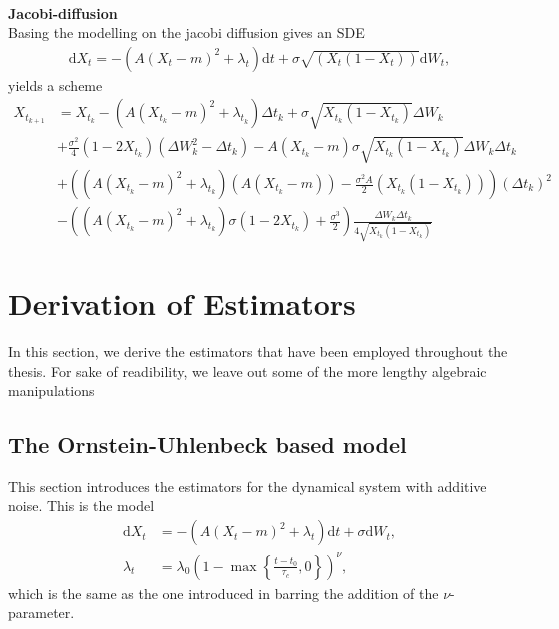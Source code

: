 \\
\textbf{Jacobi-diffusion}\\
Basing the modelling on the jacobi diffusion gives an SDE
\begin{align}
    \mathrm{d}X_t = -\left(A(X_t - m)^2 + \lambda_t\right)\mathrm{d}t + \sigma \sqrt{\left(X_t\left(1 - X_t\right)\right)}\mathrm{d}W_t,
\end{align}
yields a scheme
\begin{align}
    X_{t_{k + 1}} &= X_{t_k} - \left(A(X_{t_k} - m)^2 + \lambda_{t_k}\right) \Delta t_k + \sigma \sqrt{X_{t_k}\left(1-X_{t_k}\right)} \Delta W_{k} \nonumber\\
    &+ \frac{\sigma^2}{4}\left(1 - 2X_{t_k}\right)\left(\Delta W_k^2 - \Delta t_k\right) - A\left(X_{t_k} - m\right)\sigma \sqrt{X_{t_k}\left(1 - X_{t_k}\right)}\Delta W_k\Delta t_k \nonumber \\
    &+ \left(\left(A\left(X_{t_k} - m\right)^2 + \lambda_{t_k}\right)\left(A\left(X_{t_k} - m\right)\right) - \frac{\sigma^2A}{2}\left(X_{t_k}\left(1 - X_{t_k}\right)\right)\right)\left(\Delta t_k\right)^2 \nonumber \\
    &- \left(\left(A\left(X_{t_k} - m\right)^2 + \lambda_{t_k}\right)\sigma\left(1 - 2X_{t_k}\right) + \frac{\sigma^3}{2}\right)\frac{\Delta W_k \Delta t_k}{4\sqrt{X_{t_k}\left(1 - X_{t_k}\right)}} \label{eq:jacobiDiffusion}
\end{align}
\newpage
\section{Derivation of Estimators}\label{sec:AppendixEstim}
In this section, we derive the estimators that have been employed throughout the thesis. For sake of readibility, we leave out some of the more lengthy algebraic manipulations
\subsection{The Ornstein-Uhlenbeck based model}\label{subsec:OUprocess}
This section introduces the estimators for the dynamical system with additive noise. This is the model
\begin{align}
    \mathrm{d}X_t &= -\left(A\left(X_t - m\right)^2 + \lambda_t\right)\mathrm{d}t + \sigma \mathrm{d}W_t \label{eq:additiveModelAppedix},\\
    \lambda_t &= \lambda_0\left(1 - \max\left\{\frac{t - t_0}{\tau_c}, 0\right\}\right)^\nu,
\end{align}
which is the same as the one introduced in \cite[equation (1)]{Ditlevsen2023} barring the addition of the $\nu$-parameter.
